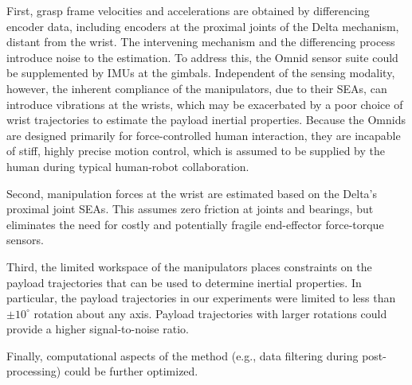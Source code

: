 \documentclass[letterpaper, 10 pt, journal, twoside]{IEEEtran}
\begin{document}
First, grasp frame velocities and accelerations are obtained by differencing encoder data, including encoders at the proximal joints of the Delta mechanism, distant from the wrist. The intervening mechanism and the differencing process introduce noise to the estimation. To address this, the Omnid sensor suite could be supplemented by IMUs at the gimbals. Independent of the sensing modality, however, the inherent compliance of the manipulators, due to their SEAs, can introduce vibrations at the wrists, which may be exacerbated by a poor choice of wrist trajectories to estimate the payload inertial properties. Because the Omnids are designed primarily for force-controlled human interaction, they are incapable of stiff, highly precise motion control, which is assumed to be supplied by the human during typical human-robot collaboration. 

Second, manipulation forces at the wrist are estimated based on the Delta's proximal joint SEAs. This assumes zero friction at joints and bearings, but eliminates the need for costly and potentially fragile end-effector force-torque sensors.

Third, the limited workspace of the manipulators places constraints on the payload trajectories that can be used to determine inertial properties. In particular, the payload trajectories in our experiments were limited to less than $\pm 10^\circ$ rotation about any axis.  Payload trajectories with larger rotations could provide a higher signal-to-noise ratio. 

Finally, computational aspects of the method (e.g., data filtering during post-processing) could be further optimized.
\end{document}
